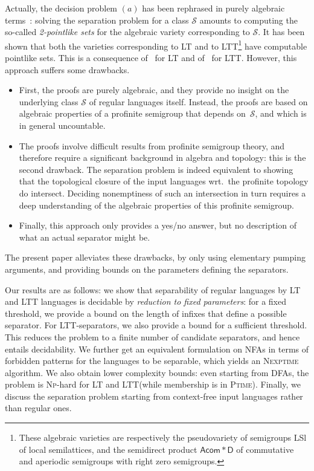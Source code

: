 \documentclass{LMCS}
\newcommand{\lt}{\textup{LT}\xspace}
\newcommand{\ltt}{\textup{LTT}\xspace}
\newcommand\Sep{\ensuremath{\mathcal{S}}\xspace}
\theoremstyle{plain}
\begin{document}
\smallskip
Actually, the decision problem $(a)$ has been rephrased in purely algebraic
terms~\cite{Almeida:SomeAlg:99}: solving the separation problem for a
class \Sep amounts to computing the so-called \emph{2-pointlike sets}
for the algebraic variety corresponding to \Sep. It has been shown
that both the varieties corresponding to \lt and to \ltt\footnote{These
  algebraic varieties are respectively the pseudovariety of semigroups
  \textsf{LSl} of local semilattices, and the semidirect product
  $\mathsf{Acom}*\mathsf{D}$ of commutative and aperiodic semigroups
  with right zero semigroups.} have computable pointlike sets. This is
a consequence
of~\cite{Costa&Nogueira:Complete-reducibility-pseudovariety:2009:a,Costa:Free-profinite-locally-idempotent:2001:a}
for \lt and
of~\cite{Beauquier&Pin:Languages-scanners:1991:a,Straubing:Finite-semigroup-varieties-form:1985:a,Steinberg:98,Steinberg:01}
for \ltt.
However, this approach suffers some drawbacks.
\begin{itemize}
\item First, the proofs are purely algebraic, and they provide no
    insight on the underlying class \Sep of regular languages
  itself. Instead, the proofs are based on algebraic properties of a
  profinite semigroup that depends on~\Sep, and which is in general uncountable.
\item The proofs involve difficult
  results from profinite semigroup theory, and therefore require a
  significant background in algebra and topology: this is the second
  drawback.
 The separation problem is indeed equivalent to showing
  that the topological closure of the input languages wrt.\ the
  profinite topology do intersect. Deciding nonemptiness of such an
  intersection in turn requires a deep understanding of the algebraic
  properties of this profinite semigroup.
\item Finally, this approach only provides a yes/no answer, but no
  description of what an actual separator might be.
\end{itemize}
The present paper alleviates these drawbacks, by only using elementary
pumping arguments, and providing bounds on the parameters defining the
separators.



\smallskip Our results are as follows: we show that separability of regular
languages by \lt and \ltt languages is decidable by \emph{reduction to fixed
  parameters}: for a fixed threshold, we provide a bound on the length of
infixes that define a possible separator. For \ltt-separators, we also provide
a bound for a sufficient threshold. This reduces the problem to a finite
number of candidate separators, and hence entails decidability. We further get
an equivalent formulation on NFAs in terms of forbidden patterns for the
languages to be separable, which yields an \textsc{Nexptime} algorithm. We
also obtain lower complexity bounds: even starting from DFAs, the problem is
\textsc{Np}-hard for \lt and \ltt (while membership is in
\textsc{Ptime}).  Finally, we discuss the separation problem starting from
context-free input languages rather than regular ones.
\end{document}
